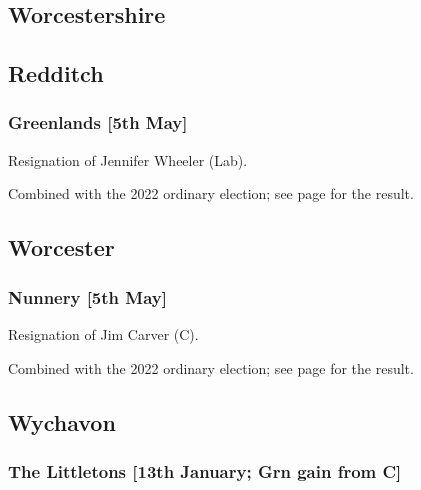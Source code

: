 \documentclass[a4paper,openany]{book}
\begin{document}
\begin{resultsiii}
\section{Worcestershire}

\subsection*{Redditch}

\subsubsection*{Greenlands \hspace*{\fill}\nolinebreak[1]%
	\enspace\hspace*{\fill}
	[5th May]}


Resignation of Jennifer Wheeler (Lab).

Combined with the 2022 ordinary election; see page \pageref{RedditchGreenlands} for the result.

\subsection*{Worcester}

\subsubsection*{Nunnery \hspace*{\fill}\nolinebreak[1]%
	\enspace\hspace*{\fill}
	[5th May]}


Resignation of Jim Carver (C).

Combined with the 2022 ordinary election; see page \pageref{WorcesterNunnery} for the result.

\subsection*{Wychavon}

\subsubsection*{The Littletons \hspace*{\fill}\nolinebreak[1]%
	\enspace\hspace*{\fill}
	[13th January; Grn gain from C]}


\end{resultsiii}
\end{document}
